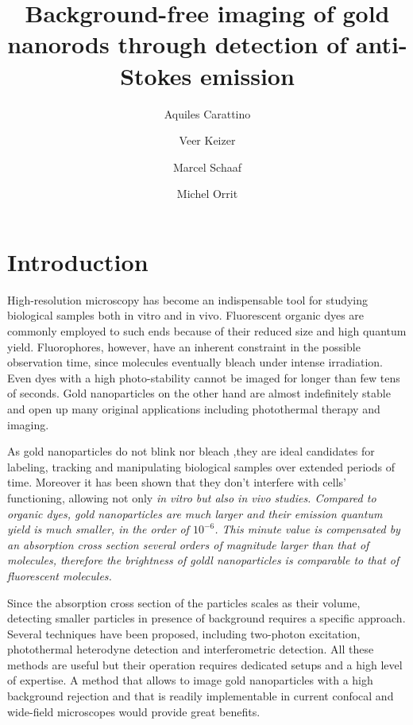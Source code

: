 \documentclass[journal=nalefd,manuscript=letter]{achemso}
\author{Aquiles Carattino}
\affiliation[Leiden]
{Huygens-Kamerlingh Onnes, Leiden, The Netherlands}
\author{Veer Keizer}
\affiliation[Leiden]
{Huygens-Kamerlingh Onnes, Leiden, The Netherlands}
\author{Marcel Schaaf}
\affiliation[Leiden]
{Huygens-Kamerlingh Onnes, Leiden, The Netherlands}
\author{Michel Orrit}
\affiliation[Leiden]
{Huygens-Kamerlingh Onnes Lab, 2300RA Leiden, The Netherlands}
\title{Background-free imaging of gold nanorods through detection of
anti-Stokes emission}
\begin{document}
\maketitle
{}
\section{Introduction}
High-resolution microscopy has become an indispensable tool for studying
biological samples both in vitro and in vivo\cite{Moerner2007}.
Fluorescent organic dyes are commonly employed to such ends because of their
reduced size and high quantum yield\cite{Lichtman2005}. Fluorophores, however,
have an inherent constraint  in the possible observation time, since molecules
eventually bleach under intense irradiation\cite{Shaner2005}. Even dyes with a
high photo-stability cannot be imaged for longer than few tens of seconds. Gold
nanoparticles on the other hand are almost indefinitely stable\cite{Jana2001}
and open up many original applications including photothermal
therapy\cite{Alkilany2012} and imaging\cite{VandenBroek2013}.

As gold nanoparticles do not blink nor bleach\cite{PEREZJUSTE2005}
\cite{Mohamed2000},they are ideal candidates for labeling, tracking and
manipulating biological samples over extended periods of time. Moreover it has
been shown that they don't interfere with cells' functioning\cite{Lewinski2008},
allowing not only \em{in vitro} but also \em{in vivo} studies. Compared to
organic dyes, gold nanoparticles are much larger and their emission
quantum yield is much smaller, in the order of $10^{-6}$\cite{Yorulmaz2012}.
This minute value is compensated by an absorption cross section several orders
of magnitude larger than that of molecules\cite{Link1999}, therefore the
brightness of goldl nanoparticles is comparable to that of fluorescent molecules.

Since the absorption cross section of the particles scales as their volume, detecting
smaller particles in presence of background requires a specific approach.
Several techniques have been proposed, including two-photon
excitation\cite{VandenBroek2013}, photothermal heterodyne
detection\cite{Berciaud2006} and interferometric detection\cite{Ignatovich2006}.
All these methods are useful but their operation requires dedicated setups and a high level of
expertise. A method that allows to image gold nanoparticles with
a high background rejection and that is readily implementable in current
confocal and wide-field microscopes would provide great benefits.
\end{document}
